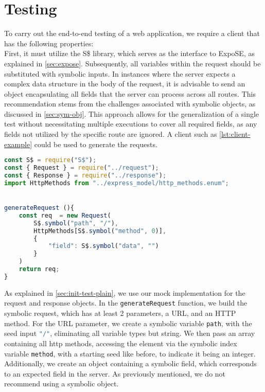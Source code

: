 \section{Testing} 
\label{sec:app-testing}
To carry out the end-to-end testing of a web application, we require a client that has the following properties:\\ 
First, it must utilize the S\$ library, which serves as the interface to ExpoSE, as explained in \autoref{sec:expose}. 
Subsequently, all variables within the request should be substituted with symbolic inputs. 
In instances where the server expects a complex data structure in the body of the request,
it is advisable to send an object encapsulating all fields that the server can process across all routes.
This recommendation stems from the challenges associated with symbolic objects, as discussed in \autoref{sec:sym-obj}. 
This approach allows for the generalization of a single test without necessitating multiple executions to cover all required fields,
as any fields not utilized by the specific route are ignored. 
A client such as  \autoref{lst:client-example} could be used to generate the requests.

\begin{lstlisting}[language=JavaScript, float, caption={[Example Client]An Example Client for symbolic requests}, label={lst:client-example}]
const S$ = require("S$");
const { Request } = require("../request");
const { Response } = require("../response");
import HttpMethods from "../express_model/http_methods.enum";


generateRequest (){
    const req  = new Request(
        S$.symbol("path", "/"),
        HttpMethods[S$.symbol("method", 0)],
        {
            "field": S$.symbol("data", "")
        }
    )
    return req;
}
\end{lstlisting}

As explained in \autoref{sec:init-test-plain}, we use our mock implementation for the request and response objects. In the \lstinline[language=JavaScript]{generateRequest} function, we build the symbolic request, which has at least 2 parameters, a URL, and an HTTP method. For the URL parameter, we create a symbolic variable \lstinline[language=JavaScript]{path}, with the seed input \lstinline[language=JavaScript]{"/"}, eliminating all variable types but string. 
We then pass an array containing all http methods, accessing the element via the symbolic index variable \lstinline[language=JavaScript]{method}, with a starting seed like before, to indicate it being an integer.
Additionally, we create an object containing a symbolic field, which corresponds to an expected field in the server. As previously mentioned, we do not recommend using a symbolic object.


